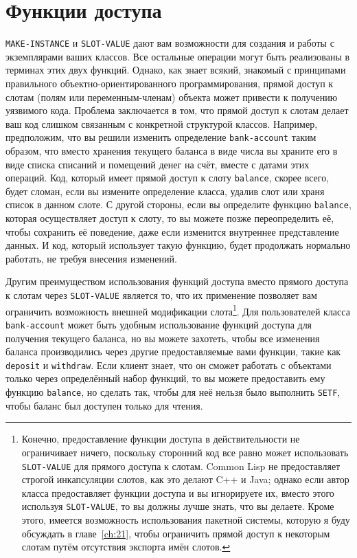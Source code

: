 \section{Функции доступа}

\lstinline{MAKE-INSTANCE} и \lstinline{SLOT-VALUE} дают вам возможности для создания и работы с
эк\-земпля\-ра\-ми ваших классов.  Все остальные операции могут быть реализованы в терминах этих
двух функций.  Однако, как знает всякий, знакомый с принципами правильного
объектно-ориентированного программирования, прямой доступ к слотам (полям или
переменным-членам) объекта может привести к получению уязвимого кода.  Проблема
заключается в том, что прямой доступ к слотам делает ваш код слишком связанным с
конкретной структурой классов.  Например, предположим, что вы решили изменить определение
\lstinline{bank-account} таким образом, что вместо хранения текущего баланса в виде числа вы
храните его в виде списка списаний и помещений денег на счёт, вместе с датами этих
операций.  Код, который имеет прямой доступ к слоту \lstinline{balance}, скорее всего, будет
сломан, если вы измените определение класса, удалив слот или храня список в данном
слоте. С другой стороны, если вы определите функцию \lstinline{balance}, которая осуществляет
доступ к слоту, то вы можете позже переопределить её, чтобы сохранить её поведение, даже
если изменится внутреннее представление данных.  И код, который использует такую функцию,
будет продолжать нормально работать, не требуя внесения изменений.

Другим преимуществом использования функций доступа вместо прямого доступа к слотам через
\lstinline{SLOT-VALUE} является то, что их применение позволяет вам ограничить возможность
внешней модификации слота\footnote{Конечно, предоставление функции доступа в
  действительности не ограничивает ничего, поскольку сторонний код все равно может
  использовать \lstinline{SLOT-VALUE} для прямого доступа к слотам. Common Lisp не
  предоставляет строгой инкапсуляции слотов, как это делают C++ и Java; однако если автор
  класса предоставляет функции доступа и вы игнорируете их, вместо этого используя
  \lstinline{SLOT-VALUE}, то вы должны лучше знать, что вы делаете.  Кроме этого, имеется
  возможность использования пакетной системы, которую я буду обсуждать в
  главе~\ref{ch:21}, чтобы ограничить прямой доступ к некоторым слотам путём отсутствия
экспорта имён слотов.}\hspace{\footnotenegspace}. Для пользователей класса \lstinline{bank-account} может быть удобным
использование функций доступа для получения текущего баланса, но вы можете захотеть, чтобы
все изменения баланса производились через другие предоставляемые вами функции, такие как
\lstinline{deposit} и \lstinline{withdraw}.  Если клиент знает, что он сможет работать с объектами
только через определённый набор функций, то вы можете предоставить ему функцию
\lstinline{balance}, но сделать так, чтобы для неё нельзя было выполнить \lstinline{SETF}, чтобы
баланс был доступен только для чтения.

